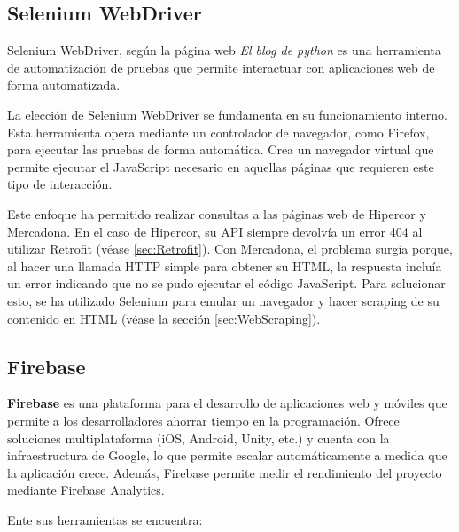 \documentclass[12pt,twoside,titlepage]{report}
\begin{document}
\subsection{Selenium WebDriver}

\label{sec:Selenium}

Selenium WebDriver, según la página web \textit{El blog de python} \cite{Selenium WebDriver} es una herramienta de automatización de pruebas que permite interactuar con aplicaciones web de forma automatizada.

La elección de Selenium WebDriver se fundamenta en su funcionamiento interno. Esta herramienta opera mediante un controlador de navegador, como Firefox, para ejecutar las pruebas de forma automática. Crea un navegador virtual que permite ejecutar el JavaScript necesario en aquellas páginas que requieren este tipo de interacción.

Este enfoque ha permitido realizar consultas a las páginas web de Hipercor y Mercadona. En el caso de Hipercor, su API siempre devolvía un error 404 al utilizar Retrofit (véase \ref{sec:Retrofit}). Con Mercadona, el problema surgía porque, al hacer una llamada HTTP simple para obtener su HTML, la respuesta incluía un error indicando que no se pudo ejecutar el código JavaScript. Para solucionar esto, se ha utilizado Selenium para emular un navegador y hacer scraping de su contenido en HTML (véase la sección \ref{sec:WebScraping}).

\subsection{Firebase}
\label{sec:Firebase}

\textbf{Firebase} \cite{Firebase} es una plataforma para el desarrollo de aplicaciones web y móviles que permite a los desarrolladores ahorrar tiempo en la programación. Ofrece soluciones multiplataforma (iOS, Android, Unity, etc.) y cuenta con la infraestructura de Google, lo que permite escalar automáticamente a medida que la aplicación crece. Además, Firebase permite medir el rendimiento del proyecto mediante Firebase Analytics.

Ente sus herramientas se encuentra: 
\end{document}
